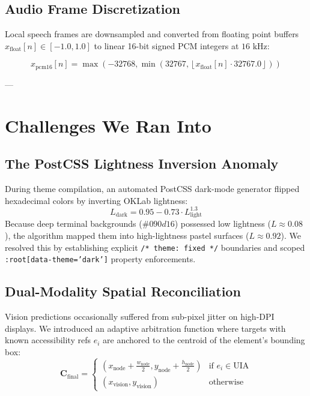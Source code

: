 \documentclass[11pt,a4paper]{article}
\begin{document}
\subsection{Audio Frame Discretization}
Local speech frames are downsampled and converted from floating point buffers $x_{\text{float}}[n] \in [-1.0, 1.0]$ to linear 16-bit signed PCM integers at $16\text{ kHz}$:

\begin{equation}
x_{\text{pcm16}}[n] = \max\left(-32768, \min\left(32767, \left\lfloor x_{\text{float}}[n] \cdot 32767.0 \right\rfloor \right)\right)
\end{equation}

---

\section{Challenges We Ran Into}

\subsection{The PostCSS Lightness Inversion Anomaly}
During theme compilation, an automated PostCSS dark-mode generator flipped hexadecimal colors by inverting OKLab lightness:
\begin{equation}
L_{\text{dark}} = 0.95 - 0.73 \cdot L_{\text{light}}^{1.3}
\end{equation}
Because deep terminal backgrounds ($\#090d16$) possessed low lightness ($L \approx 0.08$), the algorithm mapped them into high-lightness pastel surfaces ($L \approx 0.92$). We resolved this by establishing explicit \texttt{/* theme: fixed */} boundaries and scoped \texttt{:root[data-theme='dark']} property enforcements.

\subsection{Dual-Modality Spatial Reconciliation}
Vision predictions occasionally suffered from sub-pixel jitter on high-DPI displays. We introduced an adaptive arbitration function where targets with known accessibility refs $e_i$ are anchored to the centroid of the element's bounding box:
\begin{equation}
\mathbf{C}_{\text{final}} = \begin{cases}
\left( x_{\text{node}} + \frac{w_{\text{node}}}{2}, y_{\text{node}} + \frac{h_{\text{node}}}{2} \right) & \text{if } e_i \in \text{UIA} \\
(x_{\text{vision}}, y_{\text{vision}}) & \text{otherwise}
\end{cases}
\end{equation}
\end{document}
